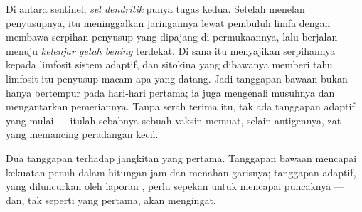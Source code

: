 \begin{proposition}\label{prop:g12:innate-immunity:handover}
Di antara  sentinel, \emph{sel dendritik}
punya tugas kedua. Setelah menelan penyusupnya,  itu meninggalkan
jaringannya lewat pembuluh limfa dengan membawa serpihan 
penyusup yang dipajang di permukaannya, lalu berjalan menuju \emph{kelenjar
getah bening} terdekat. Di sana  itu menyajikan serpihannya kepada
limfosit sistem adaptif, dan sitokina yang dibawanya memberi tahu
limfosit itu penyusup macam apa yang datang. Jadi tanggapan bawaan
bukan hanya bertempur pada hari-hari pertama; ia juga mengenali
musuhnya dan mengantarkan pemeriannya. Tanpa serah terima itu, tak ada
tanggapan adaptif yang mulai --- itulah sebabnya sebuah vaksin memuat,
selain antigennya, zat yang memancing peradangan kecil.
\end{proposition}
\admitted

\begin{omfigure}

{\small Dua tanggapan terhadap jangkitan yang pertama. Tanggapan
bawaan mencapai kekuatan penuh dalam hitungan jam dan menahan garisnya;
tanggapan adaptif, yang diluncurkan oleh laporan , perlu
sepekan untuk mencapai puncaknya --- dan, tak seperti yang pertama,
akan mengingat.}
\end{omfigure}


